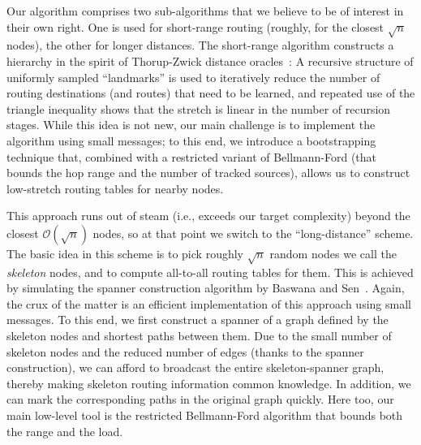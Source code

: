 \documentclass[letterpaper,11pt]{article}
\newcommand{\BO}{\mathcal{O}}
\begin{document}
Our algorithm comprises two sub-algorithms that we believe to be of interest in
their own right. One is used for short-range routing (roughly, for the closest
$\sqrt n$ nodes), the other for longer distances. The short-range algorithm
constructs a hierarchy in the spirit of Thorup-Zwick distance
oracles~\cite{TZ-05}: A recursive structure of uniformly sampled ``landmarks''
is used to iteratively reduce the number of routing destinations (and routes)
that need to be learned, and repeated use of the triangle inequality shows that
the stretch is linear in the number of recursion stages. While this idea is not
new, our main challenge is to implement the algorithm using small messages; to
this end, we introduce a bootstrapping technique that, combined with a
restricted variant of Bellmann-Ford (that bounds the hop range and the number of
tracked sources), allows us to construct low-stretch routing tables for nearby
nodes.


This approach runs out of steam (i.e., exceeds our target complexity)
beyond the closest $\BO(\sqrt n)$ 
nodes, so at that point we switch to the ``long-distance'' scheme. 
The basic idea in this scheme is to pick roughly $\sqrt{n}$ random
nodes we call the \emph{skeleton} nodes, and to
compute all-to-all routing tables for them. This is achieved by simulating the
spanner construction algorithm by Baswana and Sen~\cite{baswana07}.
Again, the crux of the matter is an efficient implementation of this approach
using small messages. To this end, we first construct a spanner of a
graph defined by the skeleton nodes and shortest paths between them. Due to the
small number of skeleton nodes and the reduced number of edges (thanks to the
spanner construction), we can afford to broadcast the entire skeleton-spanner
graph, thereby making skeleton routing information common knowledge. In addition, we
can mark the corresponding paths in the original graph quickly. Here too, our
main low-level tool is the restricted Bellmann-Ford algorithm
that bounds both the range and the load.
\end{document}
